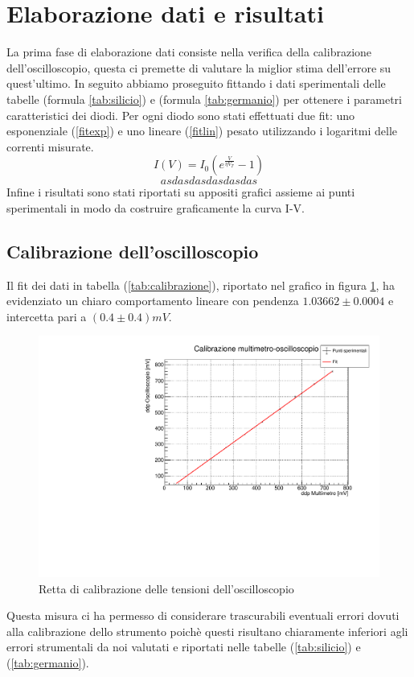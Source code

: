 \documentclass[]{article}
\begin{document}
\section{Elaborazione dati e risultati}

La prima fase di elaborazione dati consiste nella verifica della calibrazione dell'oscilloscopio, questa ci premette di valutare la miglior stima dell'errore su quest'ultimo. In seguito abbiamo proseguito fittando i dati sperimentali delle tabelle (formula \ref{tab:silicio}) e (formula \ref{tab:germanio}) per ottenere i parametri caratteristici dei diodi. Per ogni diodo sono stati effettuati due fit: uno esponenziale (\ref{fitexp}) e uno lineare (\ref{fitlin}) pesato utilizzando i logaritmi delle correnti misurate.
\begin{equation}
	I(V)=I_0(e^{\frac{V}{\eta V_T}}-1)
	\label{fitexp}
\end{equation}
\begin{equation}
	asdasdasdasdasdas%
	\label{fitlin}
\end{equation}
Infine i risultati sono stati riportati su appositi grafici assieme ai punti sperimentali in modo da costruire graficamente la curva I-V. 
  \subsection{Calibrazione dell'oscilloscopio}
Il fit dei dati in tabella (\ref{tab:calibrazione}), riportato nel grafico in figura \ref{fig:calibrazione}, ha evidenziato un chiaro comportamento lineare con pendenza $1.03662\pm0.0004$ e intercetta pari a $(0.4\pm0.4)mV$.
\begin{figure}[H]
	\centering
	\includegraphics[width=0.6\linewidth]{../Silicio/Calibrazione}
	\caption{Retta di calibrazione delle tensioni dell'oscilloscopio}
	\label{fig:calibrazione}
\end{figure}
Questa misura ci ha permesso di considerare trascurabili eventuali errori dovuti alla calibrazione dello strumento poichè questi risultano chiaramente inferiori agli errori strumentali da noi valutati e riportati nelle tabelle (\ref{tab:silicio}) e (\ref{tab:germanio}).
\end{document}
